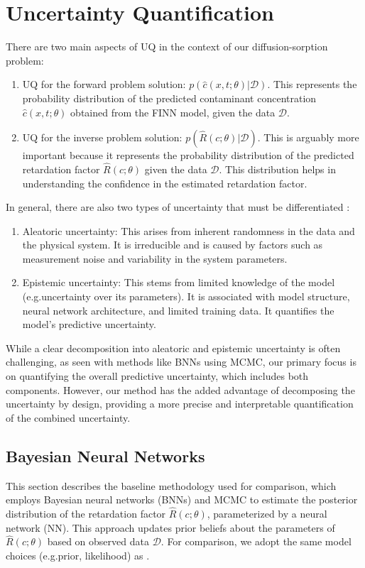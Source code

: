 \section{Uncertainty Quantification}
There are two main aspects of UQ in the context of our diffusion-sorption problem:
\begin{enumerate}
    \item UQ for the forward problem solution: $p(\hat{c}(x,t;\theta) | \mathcal{D})$. This represents the probability distribution of the predicted contaminant concentration $\hat{c}(x,t;\theta)$ obtained from the FINN model, given the data $\mathcal{D}$.
    \item UQ for the inverse problem solution: $p(\hat{R}(c;\theta) | \mathcal{D})$. This is arguably more important because it represents the probability distribution of the predicted retardation factor $\hat{R}(c;\theta)$ given the data $\mathcal{D}$. This distribution helps in understanding the confidence in the estimated retardation factor.
\end{enumerate}

In general, there are also two types of uncertainty that must be differentiated \cite{depeweg2018decomposition, gawlikowski2023survey}:

\begin{enumerate}
    \item Aleatoric uncertainty: This arises from inherent randomness in the data and the physical system. It is irreducible and is caused by factors such as measurement noise and variability in the system parameters.
    \item Epistemic uncertainty: This stems from limited knowledge of the model (e.g.\@ uncertainty over its parameters). It is associated with model structure, neural network architecture, and limited training data. It quantifies the model's predictive uncertainty.
\end{enumerate}

While a clear decomposition into aleatoric and epistemic uncertainty is often challenging, as seen with methods like BNNs using MCMC, our primary focus is on quantifying the overall predictive uncertainty, which includes both components. However, our method has the added advantage of decomposing the uncertainty by design, providing a more precise and interpretable quantification of the combined uncertainty.



\subsection{Bayesian Neural Networks}
\label{sec:bayes_nn}
This section describes the baseline methodology used for comparison, which employs Bayesian neural networks (BNNs) and MCMC to estimate the posterior distribution of the retardation factor $\hat{R}(c;\theta)$, parameterized by a neural network (NN). This approach updates prior beliefs about the parameters of $\hat{R}(c;\theta)$ based on observed data $\mathcal{D}$.
For comparison, we adopt the same model choices (e.g.\@ prior, likelihood) as \textcite{finn}.

